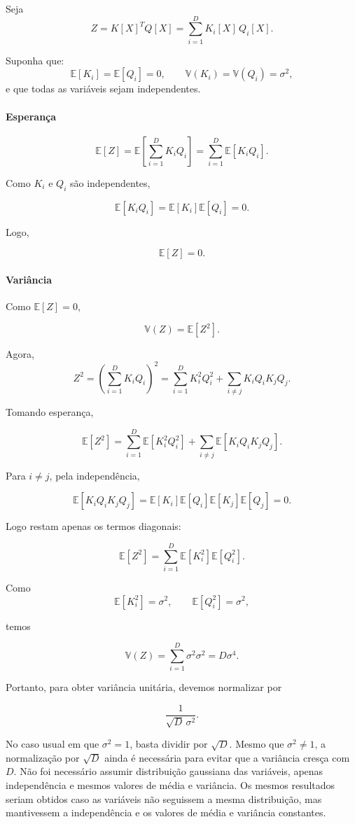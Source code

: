 Seja
\[
  Z = K[X]^T Q[X] = \sum_{i=1}^D K_i[X]\, Q_i[X].
\]

Suponha que:
\[
  \mathbb{E}[K_i]=\mathbb{E}[Q_i]=0,
  \qquad
  \mathbb{V}(K_i)=\mathbb{V}(Q_i)=\sigma^2,
\]
e que todas as variáveis sejam independentes.

\paragraph{Esperança}

\[
  \mathbb{E}[Z]
  =
  \mathbb{E}\!\left[\sum_{i=1}^D K_i Q_i\right]
  =
  \sum_{i=1}^D \mathbb{E}[K_i Q_i].
\]

Como $K_i$ e $Q_i$ são independentes,

\[
  \mathbb{E}[K_i Q_i]
  =
  \mathbb{E}[K_i]\mathbb{E}[Q_i]
  =
  0.
\]

Logo,

\[
  \mathbb{E}[Z]=0.
\]

\paragraph{Variância}

Como $\mathbb{E}[Z]=0$,

\[
  \mathbb{V}(Z)=\mathbb{E}[Z^2].
\]

Agora,
\[
  Z^2
  =
  \left(\sum_{i=1}^D K_i Q_i\right)^2
  =
  \sum_{i=1}^D K_i^2 Q_i^2
  +
  \sum_{i\neq j} K_i Q_i K_j Q_j.
\]

Tomando esperança,

\[
  \mathbb{E}[Z^2]
  =
  \sum_{i=1}^D \mathbb{E}[K_i^2 Q_i^2]
  +
  \sum_{i\neq j} \mathbb{E}[K_i Q_i K_j Q_j].
\]

Para $i\neq j$, pela independência,

\[
  \mathbb{E}[K_i Q_i K_j Q_j]
  =
  \mathbb{E}[K_i]\mathbb{E}[Q_i]\mathbb{E}[K_j]\mathbb{E}[Q_j]
  =
  0.
\]

Logo restam apenas os termos diagonais:

\[
  \mathbb{E}[Z^2]
  =
  \sum_{i=1}^D
  \mathbb{E}[K_i^2]\mathbb{E}[Q_i^2].
\]

Como
\[
  \mathbb{E}[K_i^2]=\sigma^2,
  \qquad
  \mathbb{E}[Q_i^2]=\sigma^2,
\]

temos

\[
  \mathbb{V}(Z)
  =
  \sum_{i=1}^D \sigma^2 \sigma^2
  =
  D\sigma^4.
\]

Portanto, para obter variância unitária, devemos normalizar por

\[
  \frac{1}{\sqrt{D}\,\sigma^2}.
\]

No caso usual em que $\sigma^2=1$, basta dividir por $\sqrt{D}$. Mesmo que
$\sigma^2\neq 1$, a normalização por $\sqrt{D}$ ainda é necessária
para evitar que a variância cresça com $D$.
\vspace{0.5em}
\noindent Não foi necessário assumir distribuição gaussiana das variáveis, apenas independência e mesmos valores de média e variância. Os mesmos resultados seriam obtidos caso as variáveis não seguissem a mesma distribuição, mas mantivessem a independência e os valores de média e variância constantes.
